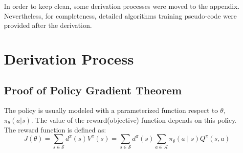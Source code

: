 \begin{appendices}
In order to keep clean, some derivation processes were moved to the appendix. Nevertheless, for completeness, detailed algorithms training pseudo-code were provided after the derivation.
	\chapter{Derivation Process} \label{appendices-derivation-process}
	\section{Proof of Policy Gradient Theorem} \label{derivation-process-gradient-pg}
	The policy is usually modeled with a parameterized function respect to $\theta$, $\pi_{\theta}(a|s)$. The value of the reward(objective) function depends on this policy. The reward function is defined as:
	\begin{equation}
	J(\theta)=\sum_{s \in \mathcal{S}} d^{\pi}(s) V^{\pi}(s)=\sum_{s \in \mathcal{S}} d^{\pi}(s) \sum_{a \in \mathcal{A}} \pi_{\theta}(a \mid s) Q^{\pi}(s, a)
\end{equation}
	

\end{appendices}
